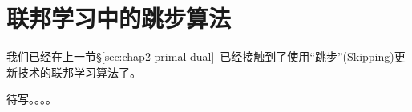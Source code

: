 \section{联邦学习中的跳步算法}
\label{sec:chap2-skip-alg}


我们已经在上一节\S\ref{sec:chap2-primal-dual}~已经接触到了使用``跳步''(Skipping)更新技术的联邦学习算法了。

待写。。。。


